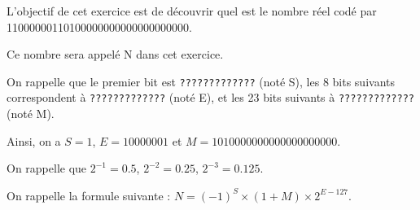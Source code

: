 \documentclass[11pt,a4paper]{exam}
\begin{document}
\begin{questions}
\begin{spacing}{1}
			
		
			
			L'objectif de cet exercice est de découvrir quel est le nombre réel codé par 11000000110100000000000000000000.
		
			Ce nombre sera appelé N dans cet exercice.
		
			On rappelle que le premier bit est  \texttt{?????????????} (noté S), les 8 bits suivants correspondent à \texttt{?????????????} (noté E), et les 23 bits suivants à \texttt{?????????????} (noté M).
		
		Ainsi, on a $S = 1$, $E = 10000001$ et $M = 1010000000000000000000$.
		
		On rappelle que $2^{-1} = 0.5$, $2^{-2} = 0.25$, $2^{-3} = 0.125$.
		
		On rappelle la formule suivante : $N = (-1)^S \times (1 + M) \times 2^{E - 127}$.
		
		\begin{solution}
			

\end{solution}
\end{spacing}
\end{questions}
\end{document}
